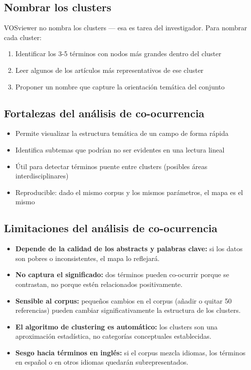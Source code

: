 \documentclass[
]{book}
\providecommand{\tightlist}{%
  \setlength{\itemsep}{0pt}\setlength{\parskip}{0pt}}
\begin{document}
\subsection{Nombrar los clusters}\label{nombrar-los-clusters}

VOSviewer no nombra los clusters --- esa es tarea del investigador. Para nombrar cada cluster:

\begin{enumerate}
\def\labelenumi{\arabic{enumi}.}
\tightlist
\item
  Identificar los 3-5 términos con nodos más grandes dentro del cluster
\item
  Leer algunos de los artículos más representativos de ese cluster
\item
  Proponer un nombre que capture la orientación temática del conjunto
\end{enumerate}

\subsection{Fortalezas del análisis de co-ocurrencia}\label{fortalezas-del-anuxe1lisis-de-co-ocurrencia}

\begin{itemize}
\tightlist
\item
  Permite visualizar la estructura temática de un campo de forma rápida
\item
  Identifica subtemas que podrían no ser evidentes en una lectura lineal
\item
  Útil para detectar términos puente entre clusters (posibles áreas interdisciplinares)
\item
  Reproducible: dado el mismo corpus y los mismos parámetros, el mapa es el mismo
\end{itemize}

\subsection{Limitaciones del análisis de co-ocurrencia}\label{limitaciones-del-anuxe1lisis-de-co-ocurrencia}

\begin{itemize}
\tightlist
\item
  \textbf{Depende de la calidad de los abstracts y palabras clave:} si los datos son pobres o inconsistentes, el mapa lo reflejará.
\item
  \textbf{No captura el significado:} dos términos pueden co-ocurrir porque se contrastan, no porque estén relacionados positivamente.
\item
  \textbf{Sensible al corpus:} pequeños cambios en el corpus (añadir o quitar 50 referencias) pueden cambiar significativamente la estructura de los clusters.
\item
  \textbf{El algoritmo de clustering es automático:} los clusters son una aproximación estadística, no categorías conceptuales establecidas.
\item
  \textbf{Sesgo hacia términos en inglés:} si el corpus mezcla idiomas, los términos en español o en otros idiomas quedarán subrepresentados.
\end{itemize}
\end{document}
